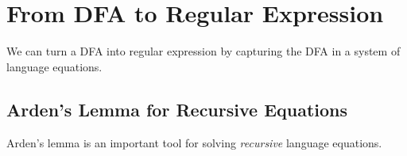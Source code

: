 \section{From DFA to Regular Expression}\label{re2fsasec}

We can turn a DFA into regular expression by capturing the DFA in a system of
language equations. 

\subsection{Arden's Lemma for Recursive Equations}

Arden's lemma is an important tool for solving \emph{recursive} language equations.

